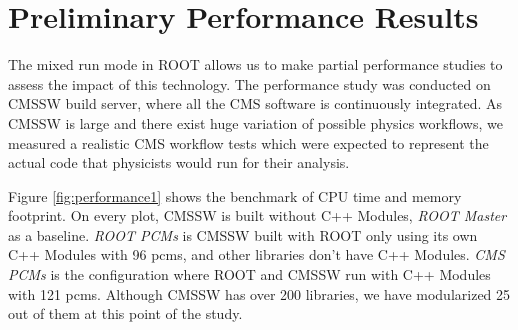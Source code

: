\documentclass[12pt]{iopart}
\begin{document}
\section{Preliminary Performance Results}
\label{results}

The mixed run mode in ROOT allows us to make partial performance studies to assess the impact of this technology. The performance study was conducted on CMSSW build server, where all the CMS software is continuously integrated. As CMSSW is large and there exist huge variation of possible physics workflows, we measured a realistic CMS workflow tests which were expected to represent the actual code that physicists would run for their analysis.

Figure \ref{fig:performance1} shows the benchmark of CPU time and memory footprint. On every plot, CMSSW is built without C++ Modules, \textit{ROOT Master} as a baseline. \textit{ROOT PCMs} is CMSSW built with ROOT only using its own C++ Modules with 96 pcms, and other libraries don't have C++ Modules. \textit{CMS PCMs} is the configuration where ROOT and CMSSW run with C++ Modules with 121 pcms. Although CMSSW has over 200 libraries, we have modularized 25 out of them at this point of the study.
\end{document}
